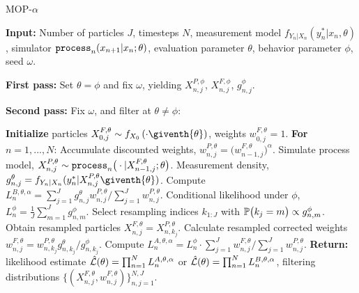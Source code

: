 \documentclass[11pt]{article}
\begin{document}
\begin{algorithm}[H]
	\caption{MOP-$\alpha$}
    \label{alg:mop}
	     \textbf{Input:} Number of particles $J$, timesteps $N$, measurement model $f_{Y_n|X_n}(y_n^*|x_n, \theta)$, simulator $\texttt{process}_n(x_{n+1}|x_n; \theta)$, evaluation parameter $\theta$, behavior parameter $\phi$, seed $\omega$.
      
        \textbf{First pass:} Set $\theta=\phi$ and fix $\omega$, yielding $X_{n,j}^{P,\phi}$, $X_{n,j}^{F,\phi}$, $g^{\phi}_{n,j}$.
            
        \textbf{Second pass:}
        Fix $\omega$, and filter at $\theta\neq \phi$:
            
		\textbf{Initialize } particles ${X}_{0,j}^{F,\theta}\sim {f}_{{X}_{0}}\left(\cdot\giventh{\theta}\right)$, weights $w^{F,\theta}_{0,j}= 1$. \newline
		\textbf{For} $n=1,...,N$: \newline
            \hspace*{4mm} Accumulate discounted weights, $w_{n,j}^{P,\theta} = \big(w_{n-1,j}^{F,\theta}\big)^\alpha$.\newline
            \hspace*{4mm} Simulate process model,
            ${X}_{n,j}^{P,\theta}\sim \texttt{process}_n\big(\cdot|{X}_{n-1,j}^{F, \theta};{\theta}\big)$. \newline
            \hspace*{4mm} Measurement density,
            $g^{\theta}_{n,j}={f}_{{Y}_{n}|{X}_{n}}(y_{n}^{*}|{X}_{n,j}^{P,\theta}\giventh{\theta})$. \newline
            \hspace*{4mm} Compute $L_n^{B,\theta,\alpha} ={\sum_{j=1}^Jg^\theta_{n,j} w^{P,\theta}_{n,j}}/{\sum_{j=1}^J  w^{P,\theta}_{n,j}}$. \newline
            \hspace*{4mm} Conditional likelihood under $\phi$,
            $L_n^{\phi} = \frac{1}{J}\sum_{m=1}^{J}g^{\phi}_{n,m}$.\newline
            \hspace*{4mm} Select resampling indices $k_{1:J}$ with $\mathbb{P}\big(k_{j}=m\big) \propto g^{\phi}_{n,m}$. \newline
            \hspace*{4mm} Obtain resampled particles ${X}_{n,j}^{F,\theta}={X}_{n,k_{j}}^{P,\theta}$. \newline
            \hspace*{4mm} Calculate resampled corrected weights
            $w_{n,j}^{F,\theta}= w^{P,\theta}_{n,k_j}  { g^{\theta}_{n,k_j}}/{ g^{\phi}_{n,k_j}}$.\newline
            \hspace*{4mm} Compute $ L_n^{A,\theta,\alpha} = L_n^\phi\cdot {\sum_{j=1}^J w^{F,\theta}_{n,j}}/{\sum_{j=1}^J  w^{P,\theta}_{n,j}}$.\newline
		\textbf{Return:} likelihood estimate $\hat{\mathcal{L}}(\theta) = \prod_{n=1}^N L_n^{A,\theta,\alpha}$ or $\hat{\mathcal{L}}(\theta) = \prod_{n=1}^N L_n^{B,\theta,\alpha}$, filtering distributions $\{(X_{n,j}^{F, \theta}, w^{F,\theta}_{n,j})\}_{n,j=1}^{N,J}.$
\end{algorithm}
\end{document}
